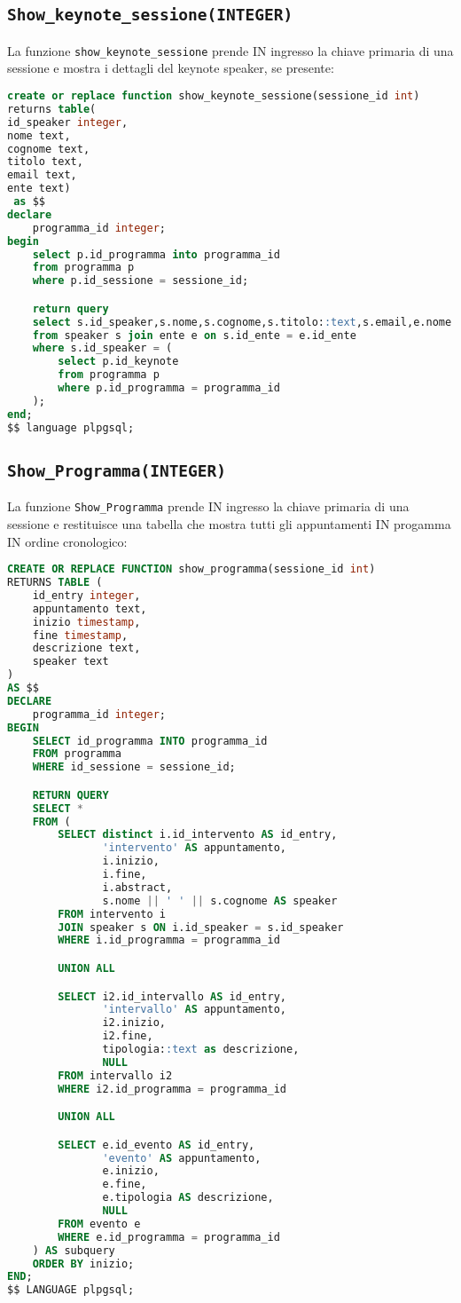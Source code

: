 \subsection{\texttt{Show\_keynote\_sessione(INTEGER)}}
La funzione \texttt{show\_keynote\_sessione} prende IN ingresso la chiave primaria di una sessione e mostra i dettagli del keynote speaker, se presente:
\begin{lstlisting}[language=SQL,style=mystyle]
create or replace function show_keynote_sessione(sessione_id int)
returns table(
id_speaker integer,
nome text,
cognome text,
titolo text,
email text,
ente text) 
 as $$
declare
    programma_id integer;
begin
    select p.id_programma into programma_id
    from programma p
    where p.id_sessione = sessione_id;

    return query
    select s.id_speaker,s.nome,s.cognome,s.titolo::text,s.email,e.nome
    from speaker s join ente e on s.id_ente = e.id_ente
    where s.id_speaker = (
        select p.id_keynote
        from programma p
        where p.id_programma = programma_id
    );
end;
$$ language plpgsql;
\end{lstlisting}
\subsection{\texttt{Show\_Programma(INTEGER)}}
La funzione \texttt{Show\_Programma} prende IN ingresso la chiave primaria di una sessione e restituisce una tabella che mostra tutti gli appuntamenti IN progamma IN ordine cronologico:
\begin{lstlisting}[language=SQL,style=mystyle]
CREATE OR REPLACE FUNCTION show_programma(sessione_id int)
RETURNS TABLE (
    id_entry integer,
    appuntamento text,
    inizio timestamp,
    fine timestamp,
    descrizione text,
    speaker text
)
AS $$
DECLARE
    programma_id integer;
BEGIN
    SELECT id_programma INTO programma_id
    FROM programma
    WHERE id_sessione = sessione_id;

    RETURN QUERY
    SELECT *
    FROM (
        SELECT distinct i.id_intervento AS id_entry,
               'intervento' AS appuntamento,
               i.inizio,
               i.fine,
               i.abstract,
               s.nome || ' ' || s.cognome AS speaker
        FROM intervento i
        JOIN speaker s ON i.id_speaker = s.id_speaker
        WHERE i.id_programma = programma_id

        UNION ALL

        SELECT i2.id_intervallo AS id_entry,
               'intervallo' AS appuntamento,
               i2.inizio,
               i2.fine,
               tipologia::text as descrizione,
               NULL
        FROM intervallo i2
        WHERE i2.id_programma = programma_id

        UNION ALL

        SELECT e.id_evento AS id_entry,
               'evento' AS appuntamento,
               e.inizio,
               e.fine,
               e.tipologia AS descrizione,
               NULL
        FROM evento e
        WHERE e.id_programma = programma_id
    ) AS subquery
    ORDER BY inizio;
END;
$$ LANGUAGE plpgsql;
\end{lstlisting}

